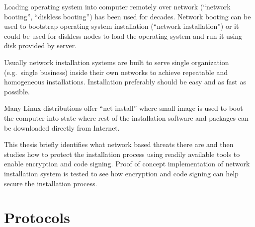 
\iffalse
FIXME: TODO REMOVE THIS LIST
\begin{itemize}
\item INTRODUCTION: The Setting - bird eye's view - the challenge to be tackled / thing to be be improved in general
\item INTRODUCTION: Past research done
\item INTRODUCTION: Gap in knowledge/problem not yet solved
\item INTRODUCTION: Purpose and method of this work
\item INTRODUCTION: More detailed description what was done
\item INTRODUCTION: Results acquired
\item INTRODUCTION: Analysis and limitations of the result (Mostly relocate to Conclusions)
\item INTRODUCTION: Value (Mostly relocate to Conclusions)
\end{itemize}
\fi

Loading operating system into computer remotely over network
(``network booting'', ``diskless booting'') has been used for
decades. Network booting can be used to bootstrap operating system
installation (``network installation'') or it could be used for
diskless nodes to load the operating system and run it using disk
provided by server.

Usually network installation systems are built to serve single
organization (e.g.\ single business) inside their own networks to
achieve repeatable and homogeneous installations. Installation
preferably should be easy and as fast as possible.

Many Linux distributions offer ``net install'' where small image is
used to boot the computer into state where rest of the installation
software and packages can be downloaded directly from Internet.

This thesis briefly identifies what network based threats there are
and then studies how to protect the installation process using readily
available tools to enable encryption and code signing. Proof of
concept implementation of network installation system is tested to see
how encryption and code signing can help secure the installation
process.

\section{Protocols}

